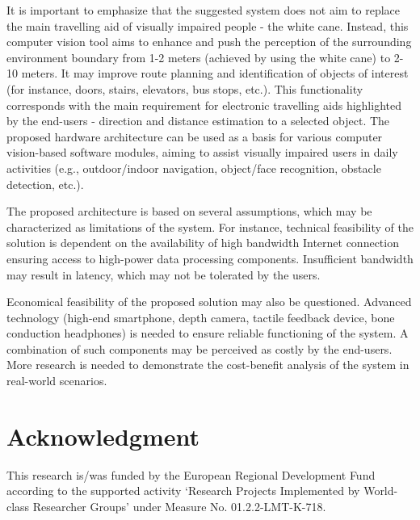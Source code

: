 \documentclass[10pt,conference,compsocconf]{IEEEtran}
\begin{document}
It is important to emphasize that the suggested system does not aim to replace the main travelling aid of visually impaired people - the white cane. Instead, this computer vision tool aims to enhance and push the perception of the surrounding environment boundary from 1-2 meters (achieved by using the white cane) to 2-10 meters. It may improve route planning and identification of objects of interest (for instance, doors, stairs, elevators, bus stops, etc.). This functionality corresponds with the main requirement for electronic travelling aids highlighted by the end-users - direction and distance estimation to a selected object. The proposed hardware architecture can be used as a basis for various computer vision-based software modules, aiming to assist visually impaired users in daily activities (e.g., outdoor/indoor navigation, object/face recognition, obstacle detection, etc.). 


The proposed architecture is based on several assumptions, which may be characterized as limitations of the system. For instance, technical feasibility of the solution is dependent on the availability of high bandwidth Internet connection ensuring access to high-power data processing components. Insufficient bandwidth may result in latency, which may not be tolerated by the users.  

Economical feasibility of the proposed solution may also be questioned. Advanced technology (high-end smartphone, depth camera, tactile feedback device, bone conduction headphones) is needed to ensure reliable functioning of the system. A combination of such components may be perceived as costly by the end-users. More research is needed to demonstrate the cost-benefit analysis of the system in real-world scenarios. 

\section*{Acknowledgment}
This research is/was funded by the European Regional Development Fund according to the supported activity ‘Research Projects Implemented by World-class Researcher Groups’ under Measure No. 01.2.2-LMT-K-718.





\end{document}
